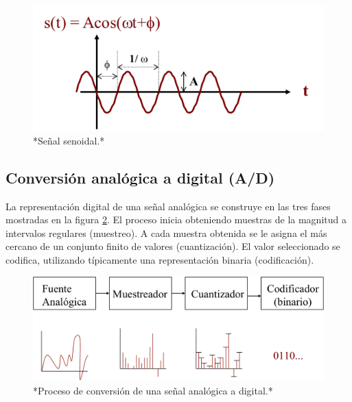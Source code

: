 \documentclass[
]{book}
\begin{document}
\begin{figure}

{\centering \includegraphics{figuras/c1/senoidal-1} 

}

\caption{*Señal senoidal.*}\label{fig:senoidal}
\end{figure}

\hypertarget{conversiuxf3n-analuxf3gica-a-digital-ad}{%
\subsection{Conversión analógica a digital (A/D)}\label{conversiuxf3n-analuxf3gica-a-digital-ad}}

La representación digital de una señal analógica se construye en las tres fases mostradas en la figura \ref{fig:conversionad}. El proceso inicia obteniendo muestras de la magnitud a intervalos regulares (muestreo). A cada muestra obtenida se le asigna el más cercano de un conjunto finito de valores (cuantización). El valor seleccionado se codifica, utilizando típicamente una representación binaria (codificación).

\begin{figure}

{\centering \includegraphics{figuras/c1/conversionad-1} 

}

\caption{*Proceso de conversión de una señal analógica a digital.*}\label{fig:conversionad}
\end{figure}
\end{document}
